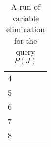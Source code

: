 \documentclass[12pt,a4paper]{article}
\begin{document}
\begin{table}[!ht]
\begin{tabular}{c|l|l|l|l}
4    &                                                                                    &                                                                             &                                                                                   &                                                                          \\
5    &                                                                                    &                                                                             &                                                                                   &                                                                          \\
6    &                                                                                    &                                                                             &                                                                                   &                                                                          \\
7    &                                                                                    &                                                                             &                                                                                   &                                                                          \\
8    &                                                                                    &                                                                             &                                                                                   &
\end{tabular}
\caption{A run of variable elimination for the query $P(J)$}
\label{table:VE}
\end{table}



\end{document}
